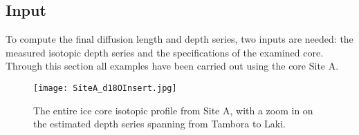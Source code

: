 \documentclass[../../CompleteThesis/Complete_1stDraft.tex]{subfiles}
\begin{document}
%		
%		
%		
%		




\subsection[Input]{Input}
\label{Subsec:Method_FirstSigmaEstimate_Input}
To compute the final diffusion length and depth series, two inputs are needed: the measured isotopic depth series and the specifications of the examined core. Through this section all examples have been carried out using the core Site A.\\
\begin{figure}
	\centering
	\texttt{[image: SiteA\_d18OInsert.jpg]}
	\caption[Full $\delta^{18}$O record with insert, Site A]{The entire ice core isotopic profile from Site A, with a zoom in on the estimated depth series spanning from Tambora to Laki.}
	\label{fig:SiteA_d18OInsert}
\end{figure}
\end{document}
